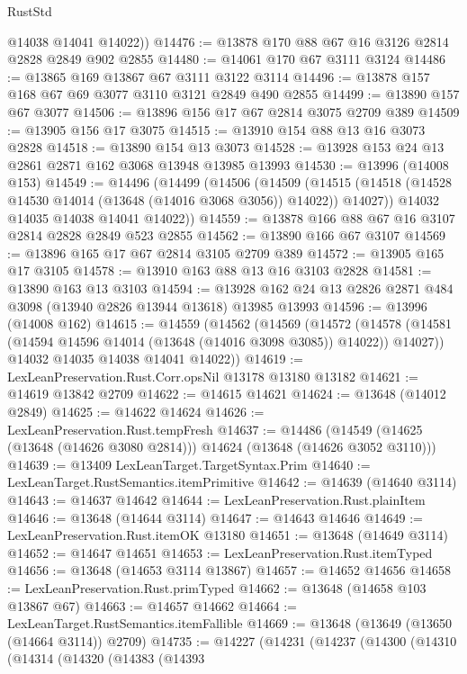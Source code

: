 \begin{lexlean}{RustStd}
\begin{coremodule}
        @14038
        @14041
        @14022))
@14476 := @13878 @170 @88 @67 @16 @3126 @2814 @2828 @2849 @902 @2855
@14480 := @14061 @170 @67 @3111 @3124
@14486 := @13865 @169 @13867 @67 @3111 @3122 @3114
@14496 := @13878 @157 @168 @67 @69 @3077 @3110 @3121 @2849 @490 @2855
@14499 := @13890 @157 @67 @3077
@14506 := @13896 @156 @17 @67 @2814 @3075 @2709 @389
@14509 := @13905 @156 @17 @3075
@14515 := @13910 @154 @88 @13 @16 @3073 @2828
@14518 := @13890 @154 @13 @3073
@14528 := @13928 @153 @24 @13 @2861 @2871 @162 @3068 @13948 @13985 @13993
@14530 := @13996 (@14008 @153)
@14549 := @14496
    (@14499
      (@14506
        (@14509
          (@14515 (@14518 (@14528 @14530 @14014 (@13648 (@14016 @3068 @3056)) @14022)) @14027))
        @14032
        @14035
        @14038
        @14041
        @14022))
@14559 := @13878 @166 @88 @67 @16 @3107 @2814 @2828 @2849 @523 @2855
@14562 := @13890 @166 @67 @3107
@14569 := @13896 @165 @17 @67 @2814 @3105 @2709 @389
@14572 := @13905 @165 @17 @3105
@14578 := @13910 @163 @88 @13 @16 @3103 @2828
@14581 := @13890 @163 @13 @3103
@14594 := @13928 @162 @24 @13 @2826 @2871 @484 @3098 (@13940 @2826 @13944 @13618) @13985 @13993
@14596 := @13996 (@14008 @162)
@14615 := @14559
    (@14562
      (@14569
        (@14572
          (@14578 (@14581 (@14594 @14596 @14014 (@13648 (@14016 @3098 @3085)) @14022)) @14027))
        @14032
        @14035
        @14038
        @14041
        @14022))
@14619 := LexLeanPreservation.Rust.Corr.opsNil @13178 @13180 @13182
@14621 := @14619 @13842 @2709
@14622 := @14615 @14621
@14624 := @13648 (@14012 @2849)
@14625 := @14622 @14624
@14626 := LexLeanPreservation.Rust.tempFresh
@14637 := @14486
    (@14549 (@14625 (@13648 (@14626 @3080 @2814))) @14624 (@13648 (@14626 @3052 @3110)))
@14639 := @13409 LexLeanTarget.TargetSyntax.Prim
@14640 := LexLeanTarget.RustSemantics.itemPrimitive
@14642 := @14639 (@14640 @3114)
@14643 := @14637 @14642
@14644 := LexLeanPreservation.Rust.plainItem
@14646 := @13648 (@14644 @3114)
@14647 := @14643 @14646
@14649 := LexLeanPreservation.Rust.itemOK @13180
@14651 := @13648 (@14649 @3114)
@14652 := @14647 @14651
@14653 := LexLeanPreservation.Rust.itemTyped
@14656 := @13648 (@14653 @3114 @13867)
@14657 := @14652 @14656
@14658 := LexLeanPreservation.Rust.primTyped
@14662 := @13648 (@14658 @103 @13867 @67)
@14663 := @14657 @14662
@14664 := LexLeanTarget.RustSemantics.itemFallible
@14669 := @13648 (@13649 (@13650 (@14664 @3114)) @2709)
@14735 := @14227
    (@14231
      (@14237
        (@14300
          (@14310
            (@14314
              (@14320
                (@14383
                  (@14393

\end{coremodule}
\end{lexlean}
